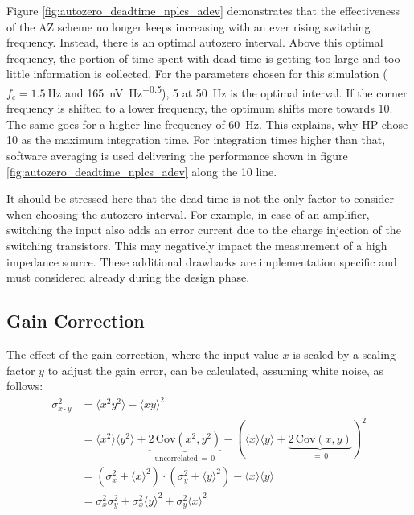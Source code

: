 Figure \ref{fig:autozero_deadtime_nplcs_adev} demonstrates that the effectiveness of the AZ scheme no longer keeps increasing with an ever rising switching frequency. Instead, there is an optimal autozero interval. Above this optimal frequency, the portion of time spent with dead time is getting too large and too little information is collected. For the parameters chosen for this simulation ($f_c = \qty{1.5}{\Hz}$ and \qty[power-half-as-sqrt, per-mode=symbol]{165}{\nV \Hz\tothe{-0.5}}), \qty{5}{\plc} at \qty{50}{\Hz} is the optimal interval. If the corner frequency is shifted to a lower frequency, the optimum shifts more towards \qty{10}{\plc}. The same goes for a higher line frequency of \qty{60}{\Hz}. This explains, why HP chose \qty{10}{\plc} as the maximum integration time. For integration times higher than that, software averaging is used delivering the performance shown in figure \ref{fig:autozero_deadtime_nplcs_adev} along the \qty{10}{\plc} line.

It should be stressed here that the dead time is not the only factor to consider when choosing the autozero interval. For example, in case of an amplifier, switching the input also adds an error current due to the charge injection of the switching transistors. This may negatively impact the measurement of a high impedance source. These additional drawbacks are implementation specific and must considered already during the design phase.

\subsection{Gain Correction}%
\label{sec:autozero_gain}
The effect of the gain correction, where the input value $x$ is scaled by a scaling factor $y$ to adjust the gain error, can be calculated, assuming white noise, as follows:
\begin{align}
    \sigma_{x \cdot y}^2 &= \langle x^2 y^2 \rangle - \langle x y \rangle^2 \nonumber\\
    &= \langle x^2 \rangle \langle y^2 \rangle + \underbrace{2\,\mathrm{Cov}\left(x^2,y^2\right)}_{\text{uncorrelated} \, = \, 0} - \left( \langle x \rangle \langle y \rangle + \underbrace{2\,\mathrm{Cov}\left(x,y\right)}_{=\, 0} \right)^2 \nonumber\\
    &= \left(\sigma_x^2 + \langle x \rangle^2\right) \cdot \left(\sigma_y^2 + \langle y \rangle^2\right) - \langle x \rangle \langle y \rangle \nonumber\\
    &= \sigma_x^2 \sigma_y^2 + \sigma_x^2 \langle y \rangle^2 + \sigma_y^2 \langle x \rangle^2 \label{eqn:variance_multiplied}
\end{align}

